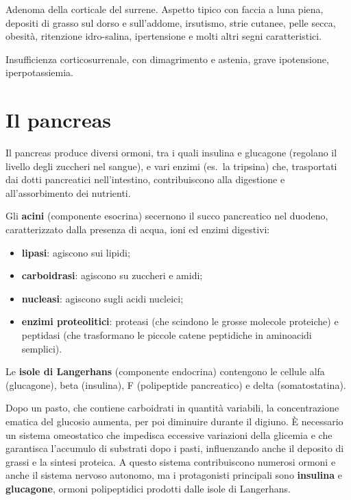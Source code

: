 Adenoma della corticale del surrene. Aspetto tipico con faccia a luna
piena, depositi di grasso sul dorso e sull'addome, irsutismo, strie
cutanee, pelle secca, obesità, ritenzione idro-salina, ipertensione e molti
altri segni caratteristici.

Insufficienza corticosurrenale, con dimagrimento e astenia, grave
ipotensione, iperpotassiemia.

\section{Il pancreas}

Il pancreas produce diversi ormoni, tra i quali insulina e glucagone
(regolano il livello degli zuccheri nel sangue), e vari enzimi (es.\ la
tripsina) che, trasportati dai dotti pancreatici nell'intestino,
contribuiscono alla digestione e all'assorbimento dei nutrienti.

Gli \textbf{acini} (componente esocrina) secernono il succo pancreatico nel
duodeno, caratterizzato dalla presenza di acqua, ioni ed enzimi digestivi:
\begin{itemize}
  \item \textbf{lipasi}: agiscono sui lipidi;
  \item \textbf{carboidrasi}: agiscono su zuccheri e amidi;
  \item \textbf{nucleasi}: agiscono sugli acidi nucleici;
  \item \textbf{enzimi proteolitici}: proteasi (che scindono le grosse
    molecole proteiche) e peptidasi (che trasformano le piccole catene
    peptidiche in aminoacidi semplici).
\end{itemize}
Le \textbf{isole di Langerhans} (componente endocrina) contengono le
cellule alfa (glucagone), beta (insulina), F (polipeptide pancreatico) e
delta (somatostatina).

Dopo un pasto, che contiene carboidrati in quantità variabili, la
concentrazione ematica del glucosio aumenta, per poi diminuire durante il
digiuno. È necessario un sistema omeostatico che impedisca eccessive
variazioni della glicemia e che garantisca l'accumulo di substrati dopo i
pasti, influenzando anche il deposito di grassi e la sintesi proteica. A
questo sistema contribuiscono numerosi ormoni e anche il sistema nervoso
autonomo, ma i protagonisti principali sono \textbf{insulina} e
\textbf{glucagone}, ormoni polipeptidici prodotti dalle isole di Langerhans.

